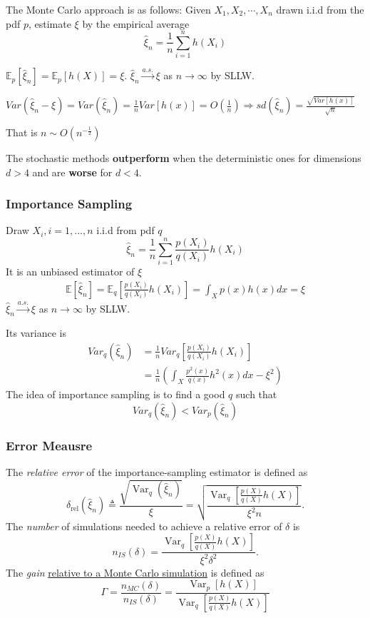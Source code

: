 \documentclass[11pt,a4paper]{article}
\begin{document}
The Monte Carlo approach is as follows: Given $X_1, X_2, \cdots, X_n$ drawn i.i.d from the pdf
$p$, estimate $\xi $ by the empirical average $$\hat{\xi}_n=\frac{1}{n}\sum_{i=1}^nh(X_i)$$

$\mathbb{E}_p[\hat{\xi}_n]=\mathbb{E}_p[h(X)]=\xi$. $\hat{\xi}_n \stackrel{a.s.}{\longrightarrow}\xi$ as $n \rightarrow \infty$ by SLLW.

$Var(\hat{\xi}_n-\xi)=Var(\hat{\xi}_n)=\frac{1}{n}Var[h(x)]=O\left(\frac{1}{n}\right) \Rightarrow sd(\hat{\xi}_n)=\frac{\sqrt{Var[h(x)]}}{\sqrt{n}}$

That is $n\sim O\left(n^{-\frac{1}{2}}\right)$

The stochastic methods \textbf{outperform} when the deterministic ones for dimensions \underline{$d >4$} and are \textbf{worse} for \underline{$d<4$}.

\subsubsection{Importance Sampling}
Draw $X_i,i=1,...,n$ i.i.d from pdf $q$ $$\hat{\xi}_n=\frac{1}{n}\sum_{i=1}^n\frac{p(X_i)}{q(X_i)}h(X_i)$$
It is an unbiased estimator of $\xi$
\begin{equation}
    \begin{aligned}
        \mathbb{E}[\hat{\xi}_n]=\mathbb{E}_q[\frac{p(X_i)}{q(X_i)}h(X_i)]=\int_X p(x)h(x)dx=\xi
    \end{aligned}
    \nonumber
\end{equation}
$\hat{\xi}_n \stackrel{a.s.}{\longrightarrow}\xi$ as $n \rightarrow \infty$ by SLLW.

Its variance is
\begin{equation}
    \begin{aligned}
        {Var}_q(\hat{\xi}_n)&=\frac{1}{n}{Var}_q\left[\frac{p(X_i)}{q(X_i)}h(X_i)\right]\\
        &=\frac{1}{n}\left(\int_X\frac{p^2(x)}{q(x)}h^2(x)dx-\xi^2\right)
    \end{aligned}
    \nonumber
\end{equation}
The idea of importance sampling is to find a good $q$ such that $${Var}_q(\hat{\xi}_n)<{Var}_p(\hat{\xi}_n)$$

\subsubsection*{Error Meausre}
The \textit{relative error} of the importance-sampling estimator is defined as
$$
\delta_{\mathrm{rel}}\left(\hat{\xi}_n\right) \triangleq \frac{\sqrt{\operatorname{Var}_q\left(\hat{\xi}_n\right)}}{\xi}=\sqrt{\frac{\operatorname{Var}_q\left[\frac{p(X)}{q(X)} h(X)\right]}{\xi^2 n}} .
$$
The \textit{number} of simulations needed to achieve a relative error of $\delta$ is
$$
n_{I S}(\delta)=\frac{\operatorname{Var}_q\left[\frac{p(X)}{q(X)} h(X)\right]}{\xi^2 \delta^2} .
$$
The \textit{gain} \underline{relative to a Monte Carlo simulation} is defined as
$$
\Gamma=\frac{n_{M C}(\delta)}{n_{I S}(\delta)}=\frac{\operatorname{Var}_p[h(X)]}{\operatorname{Var}_q\left[\frac{p(X)}{q(X)} h(X)\right]}
$$
\end{document}
